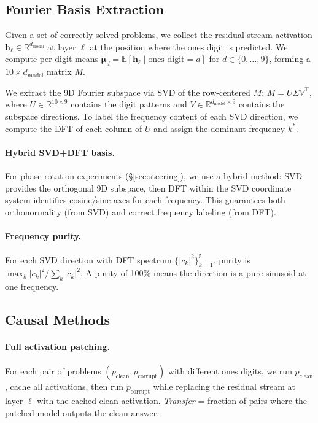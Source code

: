 \subsection{Fourier Basis Extraction}
\label{sec:method_fourier}

Given a set of correctly-solved problems, we collect the residual stream activation $\mathbf{h}_\ell \in \mathbb{R}^{d_\text{model}}$ at layer $\ell$ at the position where the ones digit is predicted. We compute per-digit means $\boldsymbol{\mu}_d = \mathbb{E}[\mathbf{h}_\ell \mid \text{ones digit} = d]$ for $d \in \{0, \ldots, 9\}$, forming a $10 \times d_\text{model}$ matrix $M$.

We extract the 9D Fourier subspace via SVD of the row-centered $M$: $\bar{M} = U \Sigma V^\top$, where $U \in \mathbb{R}^{10 \times 9}$ contains the digit patterns and $V \in \mathbb{R}^{d_\text{model} \times 9}$ contains the subspace directions. To label the frequency content of each SVD direction, we compute the DFT of each column of $U$ and assign the dominant frequency $k^*$.

\paragraph{Hybrid SVD+DFT basis.} For phase rotation experiments (\S\ref{sec:steering}), we use a hybrid method: SVD provides the orthogonal 9D subspace, then DFT within the SVD coordinate system identifies cosine/sine axes for each frequency. This guarantees both orthonormality (from SVD) and correct frequency labeling (from DFT).

\paragraph{Frequency purity.} For each SVD direction with DFT spectrum $\{|c_k|^2\}_{k=1}^5$, purity is $\max_k |c_k|^2 / \sum_k |c_k|^2$. A purity of 100\% means the direction is a pure sinusoid at one frequency.

\subsection{Causal Methods}

\paragraph{Full activation patching.} For each pair of problems $(p_\text{clean}, p_\text{corrupt})$ with different ones digits, we run $p_\text{clean}$, cache all activations, then run $p_\text{corrupt}$ while replacing the residual stream at layer $\ell$ with the cached clean activation. \emph{Transfer} = fraction of pairs where the patched model outputs the clean answer.

